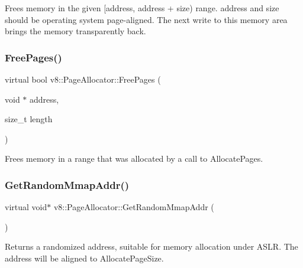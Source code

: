 Frees memory in the given \mbox{[}address, address + size) range. address and size should be operating system page-\/aligned. The next write to this memory area brings the memory transparently back. \mbox{\label{classv8_1_1PageAllocator_abc2e3fdc768aba7d35ce0cf44f14586c}} 
\subsubsection{\texorpdfstring{Free\+Pages()}{FreePages()}}
{\footnotesize\ttfamily virtual bool v8\+::\+Page\+Allocator\+::\+Free\+Pages (\begin{DoxyParamCaption}\item[{void $\ast$}]{address,  }\item[{size\+\_\+t}]{length }\end{DoxyParamCaption})\hspace{0.3cm}{\ttfamily [pure virtual]}}

Frees memory in a range that was allocated by a call to Allocate\+Pages. \mbox{\label{classv8_1_1PageAllocator_a37f194f9c5fdbe5105476cbd1432418c}} 
\subsubsection{\texorpdfstring{Get\+Random\+Mmap\+Addr()}{GetRandomMmapAddr()}}
{\footnotesize\ttfamily virtual void$\ast$ v8\+::\+Page\+Allocator\+::\+Get\+Random\+Mmap\+Addr (\begin{DoxyParamCaption}{ }\end{DoxyParamCaption})\hspace{0.3cm}{\ttfamily [pure virtual]}}

Returns a randomized address, suitable for memory allocation under A\+S\+LR. The address will be aligned to Allocate\+Page\+Size. \mbox{\label{classv8_1_1PageAllocator_a6eb6bd93c8880dd022a61a13c65f66c0}} 
